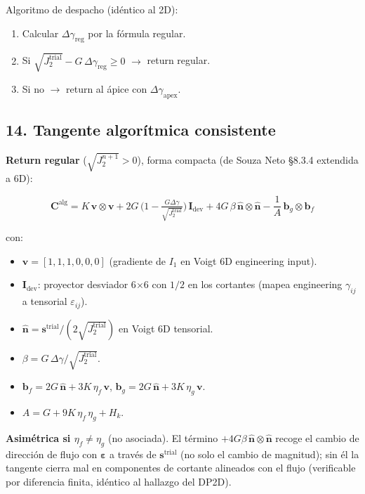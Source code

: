 \documentclass[11pt,letterpaper,oneside]{report}
\begin{document}
Algoritmo de despacho (idéntico al 2D):

\begin{enumerate}
  \item Calcular $\Delta\gamma_\text{reg}$ por la fórmula regular.
  \item Si $\sqrt{J_2^\text{trial}} - G\,\Delta\gamma_\text{reg} \geq 0$ \ensuremath{\to} return regular.
  \item Si no \ensuremath{\to} return al ápice con $\Delta\gamma_\text{apex}$.
\end{enumerate}

\subsection{14. Tangente algorítmica consistente}

\textbf{Return regular} ($\sqrt{J_2^{n+1}} > 0$), forma compacta (de Souza Neto §8.3.4 extendida a 6D):

\[
\mathbf C^\text{alg} = K\,\mathbf v\otimes\mathbf v + 2G\,\Big(1 - \tfrac{G\Delta\gamma}{\sqrt{J_2^\text{trial}}}\Big)\,\mathbf I_\text{dev} + 4G\,\beta\,\hat{\mathbf n}\otimes\hat{\mathbf n} - \frac{1}{A}\,\mathbf b_g \otimes \mathbf b_f
\]

con:

\begin{itemize}
  \item $\mathbf v = [1, 1, 1, 0, 0, 0]$ (gradiente de $I_1$ en Voigt 6D engineering input).
  \item $\mathbf I_\text{dev}$: proyector desviador 6\ensuremath{\times}6 con $1/2$ en los cortantes (mapea engineering $\gamma_{ij}$ a tensorial $\varepsilon_{ij}$).
  \item $\hat{\mathbf n} = \mathbf s^\text{trial}/(2\sqrt{J_2^\text{trial}})$ en Voigt 6D tensorial.
  \item $\beta = G\,\Delta\gamma/\sqrt{J_2^\text{trial}}$.
  \item $\mathbf b_f = 2G\,\hat{\mathbf n} + 3K\,\eta_f\,\mathbf v$, $\mathbf b_g = 2G\,\hat{\mathbf n} + 3K\,\eta_g\,\mathbf v$.
  \item $A = G + 9K\,\eta_f\,\eta_g + H_k$.
\end{itemize}

\textbf{Asimétrica si $\eta_f \neq \eta_g$} (no asociada). El término $+4G\beta\,\hat{\mathbf n}\otimes\hat{\mathbf n}$ recoge el cambio de dirección de flujo con $\boldsymbol\varepsilon$ a través de $\mathbf s^\text{trial}$ (no solo el cambio de magnitud); sin él la tangente cierra mal en componentes de cortante alineados con el flujo (verificable por diferencia finita, idéntico al hallazgo del DP2D).
\end{document}
